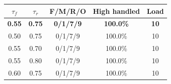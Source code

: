 \begin{tabular}{ccccc}
\toprule
$\tau_f$ & $\tau_r$ & F/M/R/O & High handled & Load \\
\midrule
\textbf{0.55} & \textbf{0.75} & \textbf{0/1/7/9} & \textbf{100.0\%} & \textbf{10} \\
0.50 & 0.75 & 0/1/7/9 & 100.0\% & 10 \\
0.55 & 0.70 & 0/1/7/9 & 100.0\% & 10 \\
0.55 & 0.80 & 0/1/7/9 & 100.0\% & 10 \\
0.60 & 0.75 & 0/1/7/9 & 100.0\% & 10 \\
\bottomrule
\end{tabular}
